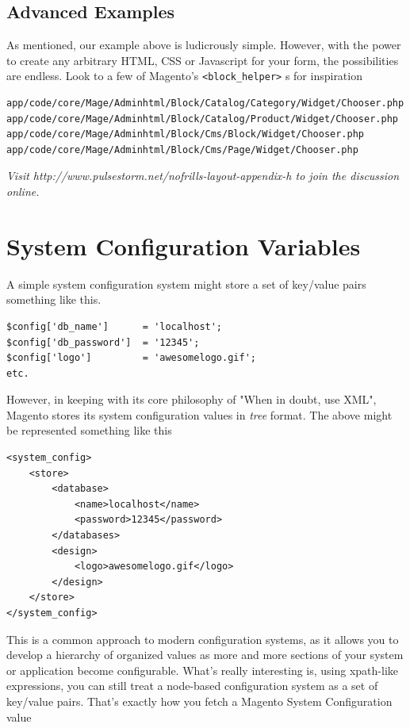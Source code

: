 \documentclass[oneside]{book}
\begin{document}
\section{Advanced Examples}

As mentioned, our example above is ludicrously simple.  However, with the power to create any arbitrary HTML, CSS or Javascript for your form, the possibilities are endless.  Look to a few of Magento's \footnotesize\texttt{\textless block\_helper\textgreater } \normalsize s for inspiration

\begin{lstlisting}
app/code/core/Mage/Adminhtml/Block/Catalog/Category/Widget/Chooser.php
app/code/core/Mage/Adminhtml/Block/Catalog/Product/Widget/Chooser.php
app/code/core/Mage/Adminhtml/Block/Cms/Block/Widget/Chooser.php
app/code/core/Mage/Adminhtml/Block/Cms/Page/Widget/Chooser.php

\end{lstlisting}


\emph{Visit http://www.pulsestorm.net/nofrills-layout-appendix-h to join the discussion online.}
\chapter{System Configuration Variables}
A simple system configuration system might store a set of key/value pairs something like this.

\begin{lstlisting}
$config['db_name']      = 'localhost';
$config['db_password']  = '12345';
$config['logo']         = 'awesomelogo.gif';
etc.

\end{lstlisting}


However, in keeping with its core philosophy of "When in doubt, use XML", Magento stores its system configuration values in \emph{tree} format.  The above might be represented something like this

\begin{lstlisting}
<system_config>
    <store>
        <database>
            <name>localhost</name>
            <password>12345</password>
        </databases>
        <design>
            <logo>awesomelogo.gif</logo>
        </design>
    </store>
</system_config>

\end{lstlisting}


This is a common approach to modern configuration systems, as it allows you to develop a hierarchy of organized values as more and more sections of your system or application become configurable.  What's really interesting is, using xpath-like expressions, you can still treat a node-based configuration system as a set of key/value pairs.  That's exactly how you fetch a Magento System Configuration value
\end{document}
